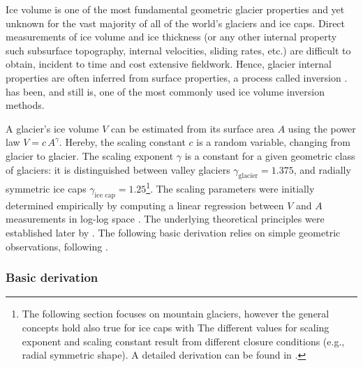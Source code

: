         Ice volume is one of the most fundamental geometric glacier properties and yet unknown for the vast majority of all of the world's glaciers and ice caps. Direct measurements of ice volume and ice thickness (or any other internal property such subsurface topography, internal velocities, sliding rates, etc.) are difficult to obtain, incident to time and cost extensive fieldwork. Hence, glacier internal properties are often inferred from surface properties, a process called inversion \citep{Bahr2014}. \Vas{} has been, and still is, one of the most commonly used ice volume inversion methods.

        A glacier's ice volume $V$ can be estimated from its surface area $A$ using the power law $V = c\, A^\gamma$. Hereby, the scaling constant $c$ is a random variable, changing from glacier to glacier. The scaling exponent $\gamma$ is a constant for a given geometric class of glaciers: it is distinguished between valley glaciers $\gamma_\text{glacier} = 1.375$, and radially symmetric ice caps $\gamma_\text{ice\ cap} = 1.25$\footnote{The following section focuses on mountain glaciers, however the general concepts hold also true for ice caps with The different values for scaling exponent and scaling constant result from different closure conditions (e.g., radial symmetric shape). A detailed derivation can be found in \citet[][Section 7.2]{Bahr2015}.}. The scaling parameters were initially determined empirically by computing a linear regression between $V$ and $A$ measurements in log-log space \citep[e.g.,][]{Chen1990}. The underlying theoretical principles were established later by \citet{Bahr1997, Bahr1997b}. The following basic derivation relies on simple geometric observations, following \citet{Bahr1997b, Bahr2015}.
        
        \subsubsection{Basic derivation} %
        \label{ssub:basic_derivation}

